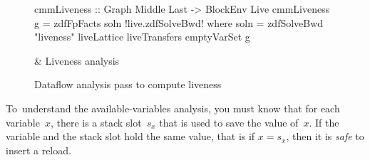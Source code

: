 \documentclass[blockstyle,preprint,natbib,nocopyrightspace]{sigplanconf}
\newcommand\slotof[1]{\ensuremath{s_{#1}}}
\newcommand\figlabel[1]{\label{fig:#1}}
\begin{document}
\begin{figure*}
\begin{codetable}
\T\begin{code}
cmmLiveness :: Graph Middle Last -> BlockEnv Live
cmmLiveness g = zdfFpFacts soln
!live.zdfSolveBwd!   where soln = zdfSolveBwd "liveness" liveLattice liveTransfers emptyVarSet g
\end{code}%
\B
& Liveness \mbox{analysis}\\
\end{codetable}
\caption{Dataflow analysis pass to compute liveness}
\figlabel{liveness-all}
\figlabel{liveness}
\figlabel{live-lattice}
\figlabel{live-transfers}
\figlabel{live-running}
\end{figure*}
%
%



To~understand the available-variables analysis, you must know that for
each variable~$x$, 
there is a stack slot~\slotof x that is used to save the value of~$x$.
%
If the variable and the stack slot hold the same value,
that is if $x = \slotof x$,
then it is \emph{safe} to insert a reload.


\end{document}

